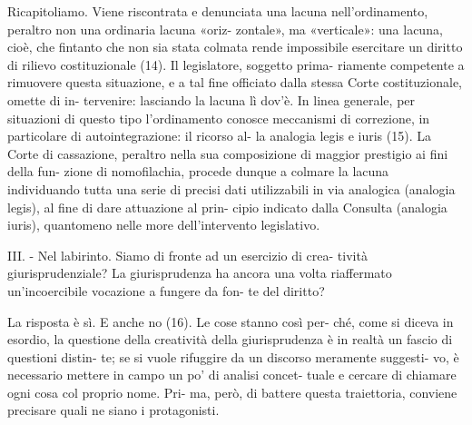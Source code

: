 Ricapitoliamo.  Viene  riscontrata  e  denunciata  una  lacuna 
nell’ordinamento,  peraltro  non  una  ordinaria  lacuna  «oriz-
zontale»,  ma  «verticale»:  una  lacuna,  cioè,  che  fintanto  che 
non  sia  stata  colmata  rende  impossibile  esercitare  un  diritto 
di  rilievo  costituzionale  (14).  Il  legislatore,  soggetto  prima-
riamente  competente  a  rimuovere  questa  situazione,  e  a  tal 
fine  officiato  dalla  stessa  Corte  costituzionale,  omette  di  in-
tervenire:  lasciando  la  lacuna  lì dov’è. In  linea generale, per 
situazioni  di  questo  tipo  l’ordinamento  conosce  meccanismi 
di correzione, in particolare di autointegrazione: il ricorso al-
la analogia legis e iuris (15). La Corte di cassazione, peraltro 
nella sua composizione di maggior prestigio ai fini della fun-
zione  di  nomofilachia,  procede  dunque  a  colmare  la  lacuna 
individuando  tutta  una  serie  di  precisi  dati  utilizzabili  in  via 
analogica  (analogia  legis),  al  fine  di  dare  attuazione  al  prin-
cipio  indicato  dalla  Consulta  (analogia  iuris),  quantomeno 
nelle more dell’intervento legislativo. 

III. - Nel labirinto. Siamo di fronte ad un esercizio di crea-
tività  giurisprudenziale?  La  giurisprudenza  ha  ancora  una 
volta riaffermato un’incoercibile vocazione a fungere da fon-
te del diritto?  

La risposta è sì. E anche no (16). Le cose stanno così per-
ché,  come  si  diceva  in  esordio,  la  questione  della  creatività 
della giurisprudenza  è  in realtà un fascio di questioni distin-
te;  se  si  vuole  rifuggire  da  un  discorso  meramente  suggesti-
vo,  è  necessario  mettere  in  campo  un  po’  di  analisi  concet-
tuale  e cercare  di chiamare ogni cosa col proprio nome. Pri-
ma,  però,  di  battere  questa  traiettoria,  conviene  precisare 
quali ne siano i protagonisti. 

